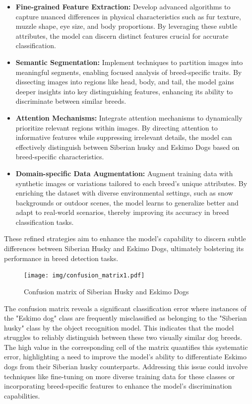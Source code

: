 \begin{itemize}
  \item \textbf{Fine-grained Feature Extraction:} Develop advanced algorithms to capture nuanced differences in physical characteristics such as fur texture, muzzle shape, eye size, and body proportions. By leveraging these subtle attributes, the model can discern distinct features crucial for accurate classification.

  \item \textbf{Semantic Segmentation:} Implement techniques to partition images into meaningful segments, enabling focused analysis of breed-specific traits. By dissecting images into regions like head, body, and tail, the model gains deeper insights into key distinguishing features, enhancing its ability to discriminate between similar breeds.

  \item \textbf{Attention Mechanisms:} Integrate attention mechanisms to dynamically prioritize relevant regions within images. By directing attention to informative features while suppressing irrelevant details, the model can effectively distinguish between Siberian husky and Eskimo Dogs based on breed-specific characteristics.

  \item \textbf{Domain-specific Data Augmentation:} Augment training data with synthetic images or variations tailored to each breed's unique attributes. By enriching the dataset with diverse environmental settings, such as snow backgrounds or outdoor scenes, the model learns to generalize better and adapt to real-world scenarios, thereby improving its accuracy in breed classification tasks.
\end{itemize}
These refined strategies aim to enhance the model's capability to discern subtle differences between Siberian Husky and Eskimo Dogs, ultimately bolstering its performance in breed detection tasks.
\vspace{1cm}
\begin{figure}[H]
\centering
\texttt{[image: img/confusion\_matrix1.pdf]}
\caption{Confusion matrix of Siberian Husky and Eskimo Dogs}
\label{fig:system-overview}
\end{figure}

The confusion matrix reveals a significant classification error where instances of the "Eskimo dog" class are frequently misclassified as belonging to the "Siberian husky" class by the object recognition model. This indicates that the model struggles to reliably distinguish between these two visually similar dog breeds. The high value in the corresponding cell of the matrix quantifies this systematic error, highlighting a need to improve the model's ability to differentiate Eskimo dogs from their Siberian husky counterparts. Addressing this issue could involve techniques like fine-tuning on more diverse training data for these classes or incorporating breed-specific features to enhance the model's discrimination capabilities.

